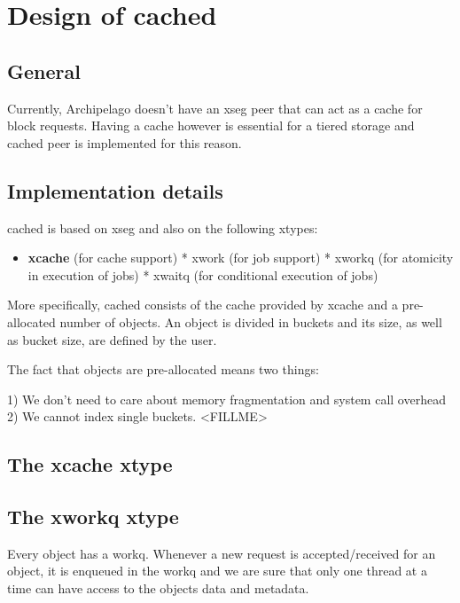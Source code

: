 \chapter{Design of cached}\label{ch:cached-design}

\section{General}

Currently, Archipelago doesn't have an xseg peer that can act as a cache for
block requests. Having a cache however is essential for a tiered storage and
cached peer is implemented for this reason.

\section{Implementation details}

cached is based on xseg and also on the following xtypes:

\begin{itemize}
	\item \textbf{xcache} (for cache support)
	* xwork (for job support)
	* xworkq (for atomicity in execution of jobs)
	* xwaitq (for conditional execution of jobs)
\end{itemize}

More specifically, cached consists of the cache provided by xcache and a
pre-allocated number of objects. An object is divided in buckets and its size,
as well as bucket size, are defined by the user.

The fact that objects are pre-allocated means two things:

1) We don't need to care about memory fragmentation and system call overhead
2) We cannot index single buckets. <FILLME>

\section{The xcache xtype}



\section{The xworkq xtype}

Every object has a workq. Whenever a new request is accepted/received for an
object, it is enqueued in the workq and we are sure that only one thread at a
time can have access to the objects data and metadata.

